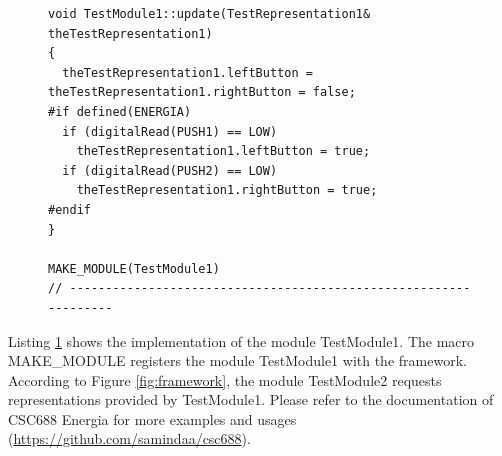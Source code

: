 \documentclass{llncs}
\begin{document}
\begin{sloppy}
\begin{figure}[!ht]
\begin{center}
\begin{verbatim}
void TestModule1::update(TestRepresentation1& theTestRepresentation1)
{
  theTestRepresentation1.leftButton = theTestRepresentation1.rightButton = false;
#if defined(ENERGIA)
  if (digitalRead(PUSH1) == LOW)
    theTestRepresentation1.leftButton = true;
  if (digitalRead(PUSH2) == LOW)
    theTestRepresentation1.rightButton = true;
#endif
}

MAKE_MODULE(TestModule1)
// -----------------------------------------------------------------
\end{verbatim}
\end{center}
\label{list:TestModule1.cpp}
\end{figure}


Listing \ref{list:TestModule1.cpp} shows the implementation of the module {\sf TestModule1}.  The
macro {\sf MAKE\_MODULE} registers the module {\sf TestModule1} with the framework. According to
Figure \ref{fig:framework}, the module {\sf TestModule2} requests representations provided by {\sf
TestModule1}. Please refer to the documentation of CSC688 Energia for more examples and usages
(\url{https://github.com/samindaa/csc688}).  




\end{sloppy}
\end{document}
